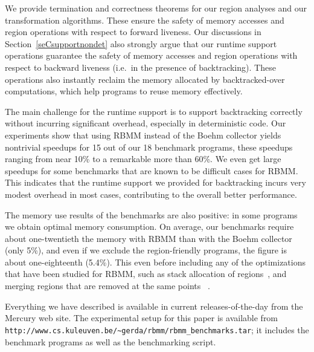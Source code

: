 \documentclass{tlp}
\newcommand{\code}[1]{{\tt#1}}
\begin{document}
We provide termination and correctness theorems
for our region analyses and our transformation algorithms.
These ensure the safety of memory accesses and region operations
with respect to forward liveness.
Our discussions in Section~\ref{seCsupportnondet} also strongly argue
that our runtime support operations
guarantee the safety of memory accesses and region operations
with respect to backward liveness
(i.e.\ in the presence of backtracking).
These operations also instantly reclaim
the memory allocated by backtracked-over computations,
which help programs to reuse memory effectively.

The main challenge for the runtime support
is to support backtracking correctly
without incurring significant overhead,
especially in deterministic code.
Our experiments show that using RBMM instead of the Boehm collector
yields nontrivial speedups for 15 out of our 18 benchmark programs,
these speedups ranging from near 10\% to a remarkable more than 60\%.
We even get large speedups for some benchmarks
that are known to be difficult cases for RBMM.
This indicates that the runtime support we provided for backtracking
incurs very modest overhead in most cases,
contributing to the overall better performance.

The memory use results of the benchmarks are also positive:
in some programs we obtain optimal memory consumption.
On average, our benchmarks require about one-twentieth the memory
with RBMM than with the Boehm collector (only 5\%),
and even if we exclude the region-friendly programs,
the figure is about one-eighteenth (5.4\%).
This even before including
any of the optimizations that have been studied for RBMM,
such as stack allocation of regions~\cite{Birkedal96from,Cherem04},
and merging regions that are removed at the same points ~\cite{Makholm00}.

Everything we have described is available
in current releases-of-the-day from the Mercury web site.
The experimental setup for this paper is available from
\code{http://www.cs.kuleuven.be/\~{}gerda/rbmm/rbmm\_benchmarks.tar};
it includes the benchmark programs as well as the benchmarking script.


\end{document}
